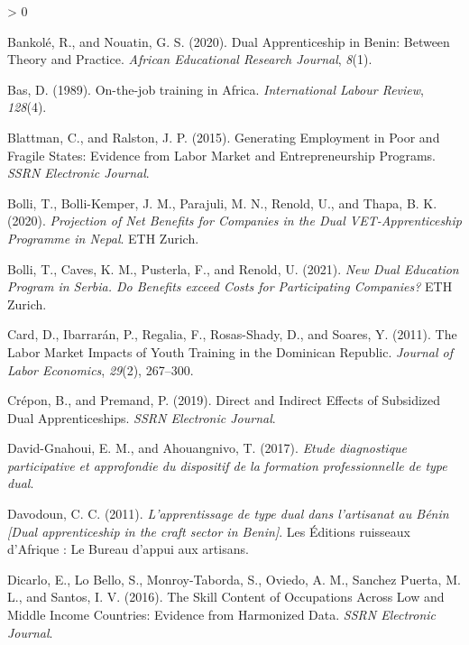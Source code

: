 \documentclass[
  11pt,
a4paper
]{article}
\newlength{\cslhangindent}
\newenvironment{CSLReferences}[2] %
 {%
  \setlength{\parindent}{0pt}
  \ifodd #1 \everypar{\setlength{\hangindent}{\cslhangindent}}\ignorespaces\fi
  \ifnum #2 > 0
  \setlength{\parskip}{#2\baselineskip}
  \fi
 }%
 {}
\begin{document}
\begin{CSLReferences}{1}{0}
\leavevmode\hypertarget{ref-bankole2020}{}%
Bankolé, R., and Nouatin, G. S. (2020). Dual {Apprenticeship} in {Benin}: {Between Theory} and {Practice}. \emph{African Educational Research Journal}, \emph{8}(1).

\leavevmode\hypertarget{ref-bas1989}{}%
Bas, D. (1989). On-the-job training in {Africa}. \emph{International Labour Review}, \emph{128}(4).

\leavevmode\hypertarget{ref-blattman2015}{}%
Blattman, C., and Ralston, J. P. (2015). Generating {Employment} in {Poor} and {Fragile States}: {Evidence} from {Labor Market} and {Entrepreneurship Programs}. \emph{SSRN Electronic Journal}.

\leavevmode\hypertarget{ref-bolli2020}{}%
Bolli, T., Bolli-Kemper, J. M., Parajuli, M. N., Renold, U., and Thapa, B. K. (2020). \emph{Projection of {Net Benefits} for {Companies} in the {Dual VET-Apprenticeship Programme} in {Nepal}}. {ETH Zurich}.

\leavevmode\hypertarget{ref-bolli2021}{}%
Bolli, T., Caves, K. M., Pusterla, F., and Renold, U. (2021). \emph{New {Dual Education Program} in {Serbia}. {Do Benefits} exceed {Costs} for {Participating Companies}?} {ETH Zurich}.

\leavevmode\hypertarget{ref-card2011}{}%
Card, D., Ibarrarán, P., Regalia, F., Rosas-Shady, D., and Soares, Y. (2011). The {Labor Market Impacts} of {Youth Training} in the {Dominican Republic}. \emph{Journal of Labor Economics}, \emph{29}(2), 267--300.

\leavevmode\hypertarget{ref-crepon2019}{}%
Crépon, B., and Premand, P. (2019). Direct and {Indirect Effects} of {Subsidized Dual Apprenticeships}. \emph{SSRN Electronic Journal}.

\leavevmode\hypertarget{ref-david-gnahoui2017}{}%
David-Gnahoui, E. M., and Ahouangnivo, T. (2017). \emph{Etude diagnostique participative et approfondie du dispositif de la formation professionnelle de type dual}.

\leavevmode\hypertarget{ref-davodoun2011}{}%
Davodoun, C. C. (2011). \emph{L'apprentissage de type dual dans l'artisanat au {Bénin} {[}{Dual} apprenticeship in the craft sector in {Benin}{]}}. {Les Éditions ruisseaux d'Afrique : Le Bureau d'appui aux artisans}.

\leavevmode\hypertarget{ref-dicarlo2016}{}%
Dicarlo, E., Lo Bello, S., Monroy-Taborda, S., Oviedo, A. M., Sanchez Puerta, M. L., and Santos, I. V. (2016). The {Skill Content} of {Occupations Across Low} and {Middle Income Countries}: {Evidence} from {Harmonized Data}. \emph{SSRN Electronic Journal}.


\end{CSLReferences}
\end{document}
